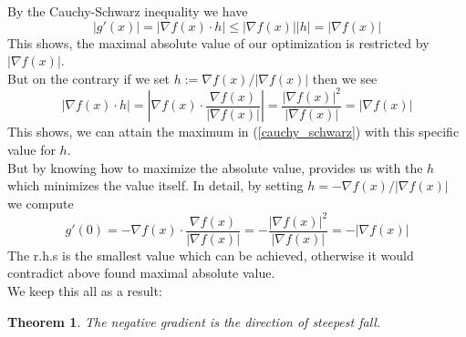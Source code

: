 \documentclass[17pt]{extarticle}
\newtheorem{theorem*}{Theorem}
\begin{document}
By the Cauchy-Schwarz inequality we have
\begin{equation} \label{cauchy_schwarz}
|g'(x)|=|\nabla f(x)\cdot h|\leq |\nabla f(x)||h|=|\nabla f(x)|
\end{equation}
This shows, the maximal absolute value of our optimization is restricted by $|\nabla f(x)|$.\\
But on the contrary if we set $h:=\nabla f(x) / |\nabla f(x)|$ then we see
$$
|\nabla f(x)\cdot h|=\left|\nabla f(x)\cdot \frac{\nabla f(x)}{|\nabla f(x)|}\right|= \frac{|\nabla f(x)|^2}{|\nabla f(x)|}=|\nabla f(x)|
$$
This shows, we can attain the maximum in (\ref{cauchy_schwarz}) with this specific value for $h$.\\
But by knowing how to maximize the absolute value, provides us with the $h$ which minimizes the value itself. In detail, by setting $h=-\nabla f(x) / |\nabla f(x)|$ we compute
$$
g'(0)=-\nabla f(x)\cdot \frac{\nabla f(x)}{|\nabla f(x)|}=
- \frac{|\nabla f(x)|^2}{|\nabla f(x)|}=-|\nabla f(x)|
$$
The r.h.s is the smallest value which can be achieved, otherwise it would contradict above found maximal absolute value.\\
We keep this all as a result:
\begin{theorem*}
	The negative gradient is the direction of steepest fall.
\end{theorem*}
\end{document}
